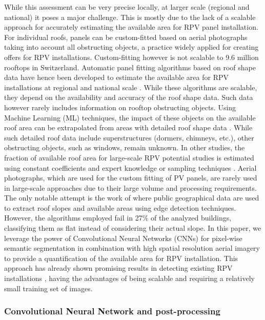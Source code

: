 While this assessment can be very precise locally, at larger scale (regional and national) it poses a major challenge. This is mostly due to the lack of a scalable approach for accurately estimating the available area for RPV panel installation. For individual roofs, panels can be custom-fitted based on aerial photographs taking into account all obstructing objects, a practice widely applied for creating offers for RPV installations. Custom-fitting however is not scalable to 9.6 million rooftops in Switzerland. Automatic panel fitting algorithms based on roof shape data have hence been developed to estimate the available area for RPV installations at regional and national scale \cite{assouline_large-scale_2018, walch_big_2020}. While these algorithms are scalable, they depend on the availability and accuracy of the roof shape data. Such data however rarely includes information on rooftop obstructing objects. Using Machine Learning (ML) techniques, the impact of these objects on the available roof area can be extrapolated from areas with detailed roof shape data \cite{assouline_large-scale_2018, walch_big_2020}. While such detailed roof data include superstructures (dormers, chimneys, etc.), other obstructing objects, such as windows, remain unknown. In other studies, the fraction of available roof area for large-scale RPV potential studies is estimated using constant coefficients and expert knowledge \cite{portmann_sonnendach.ch:_2016} or sampling techniques \cite{wiginton_quantifying_2010}. Aerial photographs, which are used for the custom fitting of PV panels, are rarely used in large-scale approaches due to their large volume and processing requirements. The only notable attempt is the work of \citet{mainzer_assessment_2017} where public geographical data are used to extract roof slopes and available areas using edge detection techniques. However, the algorithms employed fail in 27\% of the analyzed buildings, classifying them as flat instead of considering their actual slope. 
In this paper, we leverage the power of Convolutional Neural Networks (CNNs) for pixel-wise semantic segmentation in combination with high spatial resolution aerial imagery to provide a quantification of the available area for RPV installation. This approach has already shown promising results in detecting existing RPV installations \cite{castello_deep_2019}, having the advantages of being scalable and requiring a relatively small training set of images.   

\subsubsection{Convolutional Neural Network and post-processing}

